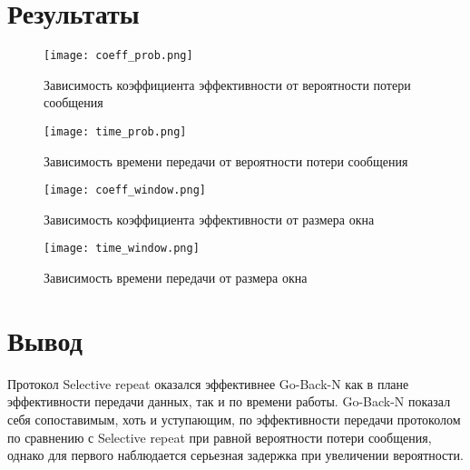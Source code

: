 \documentclass[12pt,a4paper]{article}
\begin{document}
	\section{Результаты}  
            \begin{figure}[h!]
                \centering
                \texttt{[image: coeff\_prob.png]}
                \caption{Зависимость коэффициента эффективности от вероятности потери сообщения}
            \end{figure}
            \FloatBarrier

            \begin{figure}[h!]
                \centering
                \texttt{[image: time\_prob.png]}
                \caption{Зависимость времени передачи от вероятности потери сообщения}
            \end{figure}
            \FloatBarrier

            \begin{figure}[h!]
                \centering
                \texttt{[image: coeff\_window.png]}
                \caption{Зависимость коэффициента эффективности от размера окна}
            \end{figure}
            \FloatBarrier

            \begin{figure}[h!]
                \centering
                \texttt{[image: time\_window.png]}
                \caption{Зависимость времени передачи от размера окна}
            \end{figure}
            \FloatBarrier
        \clearpage
	\newpage
 
        \section{Вывод}
        Протокол Selective repeat оказался эффективнее Go-Back-N как в плане эффективности передачи данных, так и по времени работы. Go-Back-N показал себя сопоставимым, хоть и уступающим, по эффективности передачи протоколом по сравнению с Selective repeat при равной вероятности потери сообщения, однако для первого наблюдается серьезная задержка при увеличении вероятности.
\end{document}
